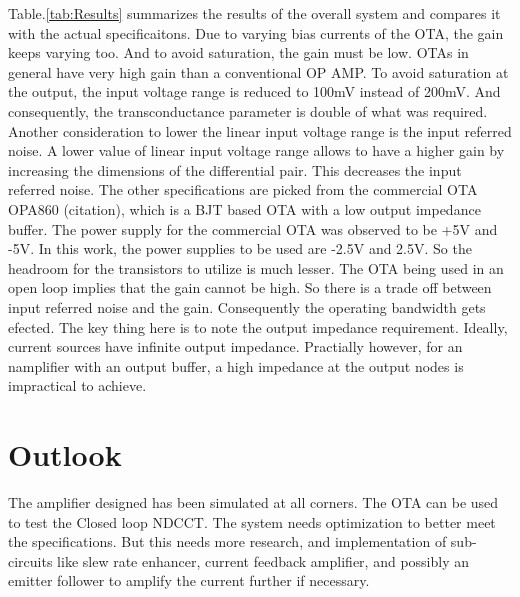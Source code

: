 Table.\ref{tab:Results} summarizes the results of the overall system and compares it with the actual specificaitons. Due to varying bias currents of the OTA, the gain keeps varying too. And to avoid saturation, the gain must be low. OTAs in general have very high gain than a conventional OP AMP. To avoid saturation at the output, the input voltage range is reduced to 100mV instead of 200mV. And consequently, the transconductance parameter is double of what was required. Another consideration to lower the linear input voltage range is the input referred noise. A lower value of linear input voltage range allows to have a higher gain by increasing the dimensions of the differential pair. This decreases the input referred noise. The other specifications are picked from the commercial OTA OPA860 (citation), which is a BJT based OTA with a low output impedance buffer. The power supply for the commercial OTA was observed to be +5V and -5V. In this work, the power supplies to be used are -2.5V and 2.5V. So the headroom for the transistors to utilize is much lesser. The OTA being used in an open loop implies that the gain cannot be high.  So there is a trade off  between input referred noise and the gain. Consequently the operating bandwidth gets efected. The key thing here is to note the output impedance requirement. Ideally, current sources have infinite output impedance. Practially however, for an namplifier with an output buffer, a high impedance at the output nodes is impractical to achieve.

\section{Outlook}

The amplifier designed has been simulated at all corners. The OTA can be used to test the Closed loop NDCCT. The system needs optimization to better meet the specifications. But this needs more research, and implementation of sub-circuits like slew rate enhancer, current feedback amplifier, and possibly an emitter follower to amplify the current further if necessary.
